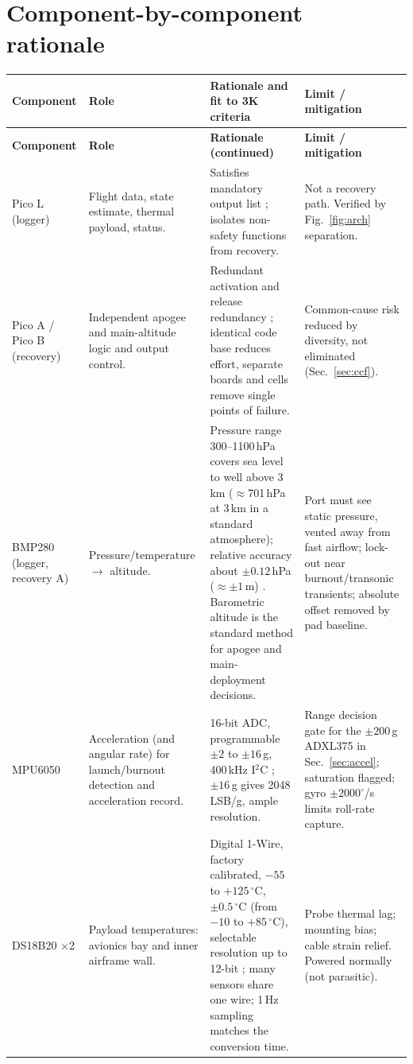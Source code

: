 \section{Component-by-component rationale}\label{sec:components}
\small
{}
\begin{longtable}{@{}L{23mm}L{30mm}L{60mm}L{37mm}@{}}
\toprule{}\textbf{Component}&\textbf{Role}&\textbf{Rationale and fit to 3K criteria}&\textbf{Limit / mitigation}\\\midrule\endfirsthead
\toprule{}\textbf{Component}&\textbf{Role}&\textbf{Rationale (continued)}&\textbf{Limit / mitigation}\\\midrule\endhead
\bottomrule\endlastfoot
Pico L (logger) & Flight data, state estimate, thermal payload, status. & Satisfies mandatory output list \cite{rtc2027app03}; isolates non-safety functions from recovery. & Not a recovery path. Verified by Fig.~\ref{fig:arch} separation.\\
Pico A / Pico B (recovery) & Independent apogee and main-altitude logic and output control. & Redundant activation and release redundancy \cite{rtc2027app03}; identical code base reduces effort, separate boards and cells remove single points of failure. & Common-cause risk reduced by diversity, not eliminated (Sec.~\ref{sec:ccf}).\\
BMP280 (logger, recovery A) & Pressure/temperature $\rightarrow$ altitude. & Pressure range 300--1100\,hPa covers sea level to well above 3\,km ($\approx$701\,hPa at 3\,km in a standard atmosphere); relative accuracy about $\pm0.12$\,hPa ($\approx\pm1$\,m) \cite{bmp280ds}. Barometric altitude is the standard method for apogee and main-deployment decisions. & Port must see static pressure, vented away from fast airflow; lock-out near burnout/transonic transients; absolute offset removed by pad baseline.\\
MPU6050 & Acceleration (and angular rate) for launch/burnout detection and acceleration record. & 16-bit ADC, programmable $\pm2$ to $\pm16$\,g, 400\,kHz I$^2$C \cite{mpu6050ds,i2cspec}; $\pm16$\,g gives 2048\,LSB/g, ample resolution. & Range decision gate for the $\pm200$\,g ADXL375 \cite{adxl375ds} in Sec.~\ref{sec:accel}; saturation flagged; gyro $\pm2000^{\circ}$/s limits roll-rate capture.\\
DS18B20 $\times$2 & Payload temperatures: avionics bay and inner airframe wall. & Digital 1-Wire, factory calibrated, $-55$ to $+125\,^{\circ}$C, $\pm0.5\,^{\circ}$C (from $-10$ to $+85\,^{\circ}$C), selectable resolution up to 12-bit \cite{ds18b20ds}; many sensors share one wire; 1\,Hz sampling matches the conversion time. & Probe thermal lag; mounting bias; cable strain relief. Powered normally (not parasitic).\\

\end{longtable}
